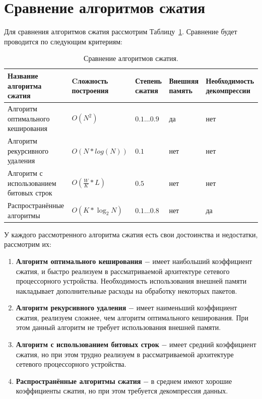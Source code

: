 \documentclass[a4paper, 12pt, titlepage, finall]{extreport}
\begin{document}
        \section{Сравнение алгоритмов сжатия}
             Для сравнения алгоритмов сжатия рассмотрим Таблицу~\ref{tab:tab1}. Сравнение будет проводится по следующим критериям:
        
        \begin{table}[ht]
            \caption{Сравнение алгоритмов сжатия.}\label{tab:tab1}
            \begin{tabular}{|m{3.5cm}|m{2.5cm}|m{2cm}|m{3.5cm}|m{4cm}|}
                \hline
                \bf Название алгоритма сжатия & \bf Cложность построения & \bf Степень сжатия & \bf Внешняя память & \bf Необходимость декомпрессии \\
                \hline
                Алгоритм оптимального кеширования & $O(N^2)$ & \(0.1 \ldots 0.9\) & да & нет \\
                \hline
                Алгоритм рекурсивного удаления & $O(N*log(N))$ & \(0.1\) & нет & нет \\
                \hline
                Алгоритм с использованием битовых строк & $O(\frac{W}{K}*L)$ & \(0.5\) & нет & нет \\
                \hline
                Распространённые алгоритмы & $O(K*\log_2{N})$ & \(0.1 \ldots 0.8\) & нет & да \\
                \hline
            \end{tabular}
        \end{table}
        
        У каждого рассмотренного алгоритма сжатия есть свои достоинства и недостатки, рассмотрим их:
        \begin{enumerate}
            \item \textbf{Алгоритм оптимального кеширования} \(-\) имеет наибольший коэффициент сжатия, и быстро реализуем в рассматриваемой архитектуре сетевого процессорного устройства. 
                Необходимость использования внешней памяти накладывает дополнительные расходы на обработку некоторых пакетов.
            \item \textbf{Алгоритм рекурсивного удаления} \(-\) имеет наименьший коэффициент сжатия,
                реализуем сложнее, чем алгоритм оптимального кеширования. При этом данный алгоритм не требует использования внешней памяти.
            \item \textbf{Алгоритм с использованием битовых строк} \(-\) имеет средний коэффициент сжатия, но при этом трудно реализуем в рассматриваемой архитектуре сетевого процессорного устройства.
            \item \textbf{Распространённые алгоритмы сжатия} \(-\) в среднем имеют хорошие коэффициенты сжатия, но при этом требуется декомпрессия данных.
        \end{enumerate}
        
\end{document}
